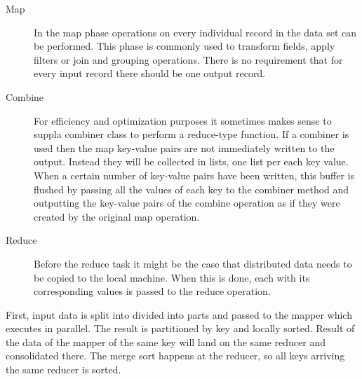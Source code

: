 \begin{description}
  \item[Map] In the map phase operations on every individual record in the data set can be performed. This phase is commonly used to transform fields, apply filters or join and grouping operations. There is no requirement that for every input record there should be one output record.
  \item[Combine] For efficiency and optimization purposes it sometimes makes sense to suppla combiner class to perform a reduce-type function. If a combiner is used then the map key-value pairs are not immediately written to the output. Instead they will be collected in lists, one list per each key value. When a certain number of key-value pairs have been written, this buffer is flushed by passing all the values of each key to the combiner method and outputting the key-value pairs of the combine operation as if they were created by the original map operation.
  \item[Reduce] Before the reduce task it might be the case that distributed data needs to be copied to the local machine. When this is done, each with its corresponding values is passed to the reduce operation. 
\end{description}

First, input data is split into divided into parts and passed to the mapper which executes in parallel. The result is partitioned by key and locally sorted. Result of the data of the mapper of the same key will land on the same reducer and consolidated there. The merge sort happens at the reducer, so all keys arriving the same reducer is sorted.

